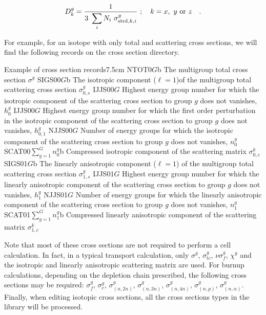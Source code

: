 \begin{equation}
D_k^g={\displaystyle 1\over\displaystyle 3 \ \sum_i N_i \ \sigma_{{\rm strd},k,i}^g}
\ ; \ \ \ k=x,\ y \ {\rm or} \ z \ \ \ .
\end{equation}

\vskip 0.2cm

For example, for an isotope with only total and scattering cross sections, we will find the
following records on the cross section directory.

\begin{DescriptionEnregistrement}{Example of cross section records}{7.5cm}
\RealEnr
  {NTOT0}{$G$}{b}
  {The multigroup total cross section $\sigma^{g}$}
\RealEnr
 {SIGS00}{$G$}{b}
 {The isotropic component ($\ell=1$)of the multigroup total scattering cross
  section
  $\sigma_{0,s}^{g}$}
\IntEnr
  {IJJS00}{$G$}
  {Highest energy group number for which 
   the isotropic component of the scattering cross section to group $g$ does not
   vanishes, $h_{0}^{g}$}
\IntEnr
  {IJJS00}{$G$}
  {Highest energy group number for which the first order perturbation in
   the isotropic component of the scattering cross section to group $g$ does not
   vanishes, $h_{0,1}^{g}$}
\IntEnr
  {NJJS00}{$G$}
  {Number of energy groups for which 
   the isotropic component of the scattering cross section to group $g$ does not
   vanishes, $n_{0}^{g}$}
\RealEnr
  {SCAT00}{$\sum_{g=1}^{G} n_{0}^{g}$}{b}
  {Compressed isotropic component of the scattering matrix
   $\sigma_{0,c}^{k}$}
\RealEnr
 {SIGS01}{$G$}{b}
 {The linearly anisotropic component ($\ell=1$) 
  of the multigroup total scattering cross section 
  $\sigma_{1,s}^{g}$}
\IntEnr
  {IJJS01}{$G$}
  {Highest energy group number for which 
   the linearly anisotropic component of the scattering cross section
   to group $g$ does not vanishes,
   $h_{1}^{g}$}
\IntEnr
  {NJJS01}{$G$}
  {Number of energy groups for which 
   the linearly anisotropic component of the scattering cross section 
   to group $g$ does not vanishes,
   $n_{1}^{g}$}
\RealEnr
  {SCAT01}{$\sum_{g=1}^{G} n_{1}^{g}$}{b}
  {Compressed linearly anisotropic component of the scattering matrix
   $\sigma_{1,c}^{k}$}
\end{DescriptionEnregistrement}

Note that most of these cross sections are not required to perform a cell
calculation. In fact, in a typical transport calculation, only
$\sigma^{g}$, $\sigma_{tc}^{g}$, $\nu\sigma_{f}^{g}$, $\chi^{g}$ and the
isotropic and linearly anisotropic scattering matrix are
used. For burnup calculations, depending on the depletion chain prescribed,
the following cross sections may be required:
$\sigma_{f}^{g}$, $\sigma_{c}^{g}$, $\sigma_{(n,2n)}^{g}$, $\sigma_{(n,3n)}^{g}$,
$\sigma_{(n,4n)}^{g}$, $\sigma_{(n,p)}^{g}$, $\sigma_{(n,\alpha)}^{g}$.
Finally, when editing isotopic cross sections, all the cross sections types in
the library will be processed.

